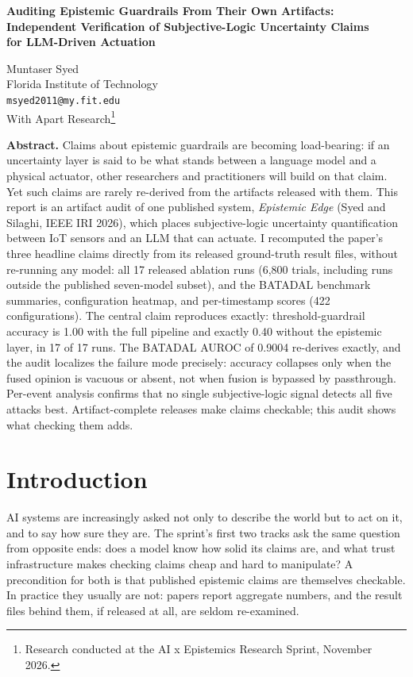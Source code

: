 \documentclass[11pt]{article}
\begin{document}
\begin{center}
{\LARGE\bfseries Auditing Epistemic Guardrails From Their Own Artifacts:\\[2pt]
Independent Verification of Subjective-Logic Uncertainty Claims\\ for LLM-Driven Actuation\par}
\vspace{10pt}
Muntaser Syed\\
Florida Institute of Technology\\
\texttt{msyed2011@my.fit.edu}\\[4pt]
{\small With Apart Research\footnote{Research conducted at the AI x Epistemics Research Sprint, November 2026.}}
\end{center}

\vspace{4pt}
\noindent\textbf{Abstract.}
Claims about epistemic guardrails are becoming load-bearing: if an uncertainty layer is said to be what stands between a language model and a physical actuator, other researchers and practitioners will build on that claim. Yet such claims are rarely re-derived from the artifacts released with them. This report is an artifact audit of one published system, \textit{Epistemic Edge} (Syed and Silaghi, IEEE IRI 2026), which places subjective-logic uncertainty quantification between IoT sensors and an LLM that can actuate. I recomputed the paper's three headline claims directly from its released ground-truth result files, without re-running any model: all 17 released ablation runs (6,800 trials, including runs outside the published seven-model subset), and the BATADAL benchmark summaries, configuration heatmap, and per-timestamp scores (422 configurations). The central claim reproduces exactly: threshold-guardrail accuracy is 1.00 with the full pipeline and exactly 0.40 without the epistemic layer, in 17 of 17 runs. The BATADAL AUROC of 0.9004 re-derives exactly, and the audit localizes the failure mode precisely: accuracy collapses only when the fused opinion is vacuous or absent, not when fusion is bypassed by passthrough. Per-event analysis confirms that no single subjective-logic signal detects all five attacks best. Artifact-complete releases make claims checkable; this audit shows what checking them adds.

\section{Introduction}

AI systems are increasingly asked not only to describe the world but to act on it, and to say how sure they are. The sprint's first two tracks ask the same question from opposite ends: does a model know how solid its claims are, and what trust infrastructure makes checking claims cheap and hard to manipulate? A precondition for both is that published epistemic claims are themselves checkable. In practice they usually are not: papers report aggregate numbers, and the result files behind them, if released at all, are seldom re-examined.
\end{document}
